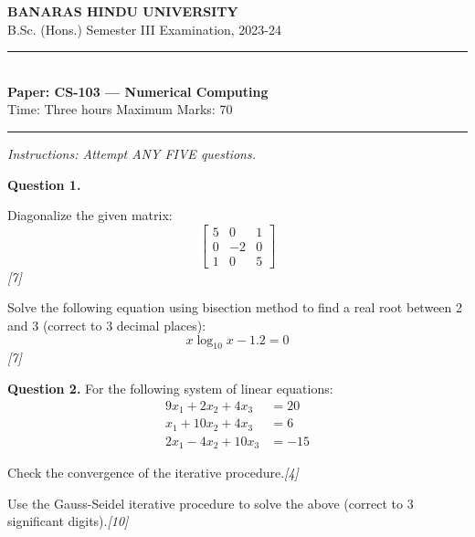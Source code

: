 \documentclass[11pt,a4paper]{article}
\newcommand{\pts}[1]{\hfill   \textit{[#1]}}
\begin{document}
\begin{center}
  {\large\bfseries BANARAS HINDU UNIVERSITY}\\[2pt]
  {\normalsize B.Sc. (Hons.) Semester III Examination, 2023-24}\\[6pt]
  \rule{0.8\linewidth}{0.5pt}\\[6pt]
  {\large\bfseries Paper: CS-103 --- Numerical Computing}\\[4pt]
  {\normalsize Time: Three hours \hfill Maximum Marks: 70}
\end{center}

\rule{\linewidth}{0.4pt}

\smallskip



\noindent   \textit{Instructions: Attempt ANY FIVE questions.}

\bigskip

\medskip


\noindent   \textbf{Question 1.}

\begin{parts}
  \item Diagonalize the given matrix:
  \[ 
\begin{bmatrix} 5 & 0 & 1 \\ 0 & -2 & 0 \\ 1 & 0 & 5 \end{bmatrix} \]\pts{7}
  \item Solve the following equation using bisection method to find a real root between 2 and 3 (correct to 3 decimal places):
  \[ x \log_{10} x - 1.2 = 0 \]\pts{7}
\end{parts}

\medskip


\noindent   \textbf{Question 2.} For the following system of linear equations:
\[

\begin{aligned}
  9x_1 + 2x_2 + 4x_3 &= 20 \\
  x_1 + 10x_2 + 4x_3 &= 6 \\
  2x_1 - 4x_2 + 10x_3 &= -15
\end{aligned}
\]

\begin{parts}
  \item Check the convergence of the iterative procedure.\pts{4}
  \item Use the Gauss-Seidel iterative procedure to solve the above (correct to 3 significant digits).\pts{10}
\end{parts}
\end{document}
